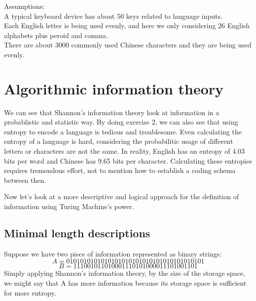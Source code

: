 \documentclass[12pt]{article}
\begin{document}
Assumptions:\\
A typical keyboard device has about 50 keys related to language inputs.\\
Each English letter is being used evenly, and here we only considering 26 English alphabets plus peroid and comma.\\
There are about 3000 commonly used Chinese characters and they are being used evenly.\\

\section{Algorithmic information theory}
We can see that Shannon's information theory look at information in a probablistic and statistic way. By doing exercise 2, we can also see that using entropy to encode a language is tedious and troublesome. Even calculating the entropy of a language is hard, considering the probabilitic usage of different letters or characters are not the same. In reality, English has an entropy of 4.03 bits per word and Chinese has 9.65 bits per character. Calculating these entropies requires tremendous effort, not to mention how to establish a coding schema between then.

Now let's look at a more descriptive and logical approach for the definition of information using Turing Machine's power.

\subsection{Minimal length descriptions}
Suppose we have two piece of information represented as binary strings:
\[
A = 0101010101010101010101010101010101010101
\]
\[
B = 111001011010001110101000011101001101
\]
Simply applying Shannon's information theory, by the size of the storage space, we might say that A has more information because its storage space is sufficient for more entropy. 
\end{document}
